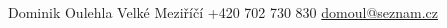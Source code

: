 \documentclass{modernsimplecv}
\newlength{\rightcolwidth}
\begin{document}
\begin{paracol}{2}










\end{paracol}

\vfill{} %

\setlength{\parindent}{0pt}
\begin{minipage}[t]{\textwidth}
\begin{center}\fontfamily{\sfdefault}\selectfont \color{black!70}
{\small Dominik Oulehla  Velké Meziříčí  +420 702 730 830 
 \protect\url{domoul@seznam.cz}
}
\end{center}
\end{minipage}
\end{document}
